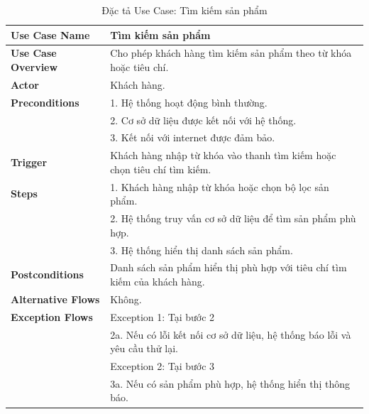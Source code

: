 {\begin{longtable}{|>{\bfseries}p{4cm}|p{11.5cm}|}
\caption{Đặc tả Use Case: Tìm kiếm sản phẩm}
\label{tab:uc-search-product} \\
\hline
\textbf{Use Case Name} & Tìm kiếm sản phẩm \\
\hline
\textbf{Use Case Overview} & Cho phép khách hàng tìm kiếm sản phẩm theo từ khóa hoặc tiêu chí. \\
\hline
\textbf{Actor} & Khách hàng. \\
\hline
\textbf{Preconditions} & 1. Hệ thống hoạt động bình thường. \\
& 2. Cơ sở dữ liệu được kết nối với hệ thống. \\
& 3. Kết nối với internet được đảm bảo. \\
\hline
\textbf{Trigger} & Khách hàng nhập từ khóa vào thanh tìm kiếm hoặc chọn tiêu chí tìm kiếm. \\
\hline
\textbf{Steps} & 1. Khách hàng nhập từ khóa hoặc chọn bộ lọc sản phẩm. \\
& 2. Hệ thống truy vấn cơ sở dữ liệu để tìm sản phẩm phù hợp. \\
& 3. Hệ thống hiển thị danh sách sản phẩm. \\
\hline
\textbf{Postconditions} & Danh sách sản phẩm hiển thị phù hợp với tiêu chí tìm kiếm của khách hàng. \\
\hline
\textbf{Alternative Flows} & Không. \\
\hline
\textbf{Exception Flows} & Exception 1: Tại bước 2 \\
& 2a. Nếu có lỗi kết nối cơ sở dữ liệu, hệ thống báo lỗi và yêu cầu thử lại. \\
& Exception 2: Tại bước 3 \\
& 3a. Nếu có sản phẩm phù hợp, hệ thống hiển thị thông báo. \\
\hline
\end{longtable}

}
